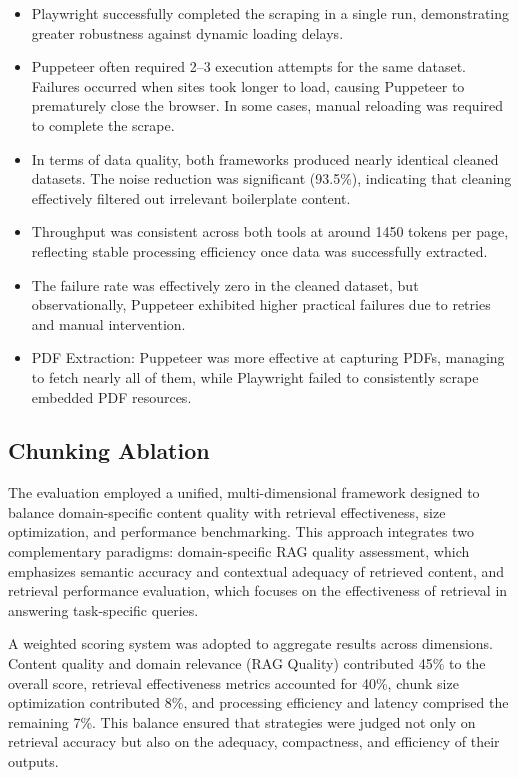\begin{itemize}
	\item Playwright successfully completed the scraping in a single run, demonstrating greater robustness against dynamic loading delays.
	
	\item Puppeteer often required 2–3 execution attempts for the same dataset. Failures occurred when sites took longer to load, causing Puppeteer to prematurely close the browser. In some cases, manual reloading was required to complete the scrape.
	
	\item In terms of data quality, both frameworks produced nearly identical cleaned datasets. The noise reduction was significant (93.5\%), indicating that cleaning effectively filtered out irrelevant boilerplate content.
	
	\item Throughput was consistent across both tools at around 1450 tokens per page, reflecting stable processing efficiency once data was successfully extracted.
	
	\item The failure rate was effectively zero in the cleaned dataset, but observationally, Puppeteer exhibited higher practical failures due to retries and manual intervention.
	
	\item PDF Extraction: Puppeteer was more effective at capturing PDFs, managing to fetch nearly all of them, while Playwright failed to consistently scrape embedded PDF resources.
\end{itemize}

\subsection{Chunking Ablation}
	
The evaluation employed a unified, multi-dimensional framework designed to balance domain-specific content quality with retrieval effectiveness, size optimization, and performance benchmarking. This approach integrates two complementary paradigms: domain-specific RAG quality assessment, which emphasizes semantic accuracy and contextual adequacy of retrieved content, and retrieval performance evaluation, which focuses on the effectiveness of retrieval in answering task-specific queries.

A weighted scoring system was adopted to aggregate results across dimensions. Content quality and domain relevance (RAG Quality) contributed 45\% to the overall score, retrieval effectiveness metrics accounted for 40\%, chunk size optimization contributed 8\%, and processing efficiency and latency comprised the remaining 7\%. This balance ensured that strategies were judged not only on retrieval accuracy but also on the adequacy, compactness, and efficiency of their outputs.


